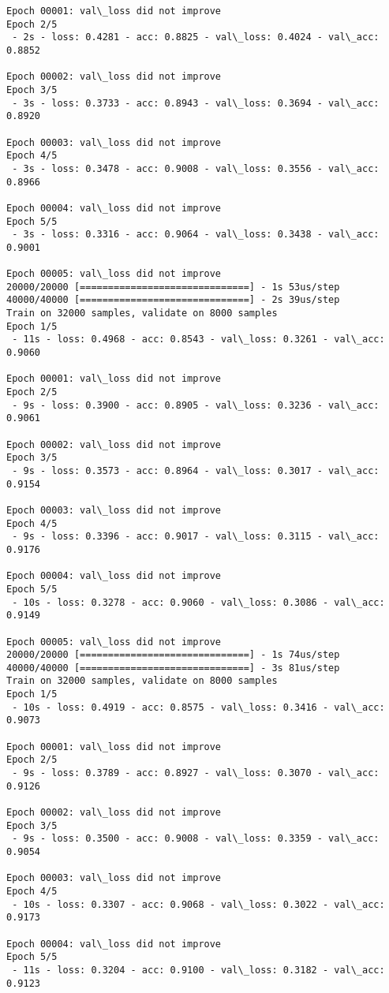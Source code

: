 \documentclass[11pt]{article}
\begin{document}
\begin{Verbatim}[commandchars=\\\{\}]
Epoch 00001: val\_loss did not improve
Epoch 2/5
 - 2s - loss: 0.4281 - acc: 0.8825 - val\_loss: 0.4024 - val\_acc: 0.8852

Epoch 00002: val\_loss did not improve
Epoch 3/5
 - 3s - loss: 0.3733 - acc: 0.8943 - val\_loss: 0.3694 - val\_acc: 0.8920

Epoch 00003: val\_loss did not improve
Epoch 4/5
 - 3s - loss: 0.3478 - acc: 0.9008 - val\_loss: 0.3556 - val\_acc: 0.8966

Epoch 00004: val\_loss did not improve
Epoch 5/5
 - 3s - loss: 0.3316 - acc: 0.9064 - val\_loss: 0.3438 - val\_acc: 0.9001

Epoch 00005: val\_loss did not improve
20000/20000 [==============================] - 1s 53us/step
40000/40000 [==============================] - 2s 39us/step
Train on 32000 samples, validate on 8000 samples
Epoch 1/5
 - 11s - loss: 0.4968 - acc: 0.8543 - val\_loss: 0.3261 - val\_acc: 0.9060

Epoch 00001: val\_loss did not improve
Epoch 2/5
 - 9s - loss: 0.3900 - acc: 0.8905 - val\_loss: 0.3236 - val\_acc: 0.9061

Epoch 00002: val\_loss did not improve
Epoch 3/5
 - 9s - loss: 0.3573 - acc: 0.8964 - val\_loss: 0.3017 - val\_acc: 0.9154

Epoch 00003: val\_loss did not improve
Epoch 4/5
 - 9s - loss: 0.3396 - acc: 0.9017 - val\_loss: 0.3115 - val\_acc: 0.9176

Epoch 00004: val\_loss did not improve
Epoch 5/5
 - 10s - loss: 0.3278 - acc: 0.9060 - val\_loss: 0.3086 - val\_acc: 0.9149

Epoch 00005: val\_loss did not improve
20000/20000 [==============================] - 1s 74us/step
40000/40000 [==============================] - 3s 81us/step
Train on 32000 samples, validate on 8000 samples
Epoch 1/5
 - 10s - loss: 0.4919 - acc: 0.8575 - val\_loss: 0.3416 - val\_acc: 0.9073

Epoch 00001: val\_loss did not improve
Epoch 2/5
 - 9s - loss: 0.3789 - acc: 0.8927 - val\_loss: 0.3070 - val\_acc: 0.9126

Epoch 00002: val\_loss did not improve
Epoch 3/5
 - 9s - loss: 0.3500 - acc: 0.9008 - val\_loss: 0.3359 - val\_acc: 0.9054

Epoch 00003: val\_loss did not improve
Epoch 4/5
 - 10s - loss: 0.3307 - acc: 0.9068 - val\_loss: 0.3022 - val\_acc: 0.9173

Epoch 00004: val\_loss did not improve
Epoch 5/5
 - 11s - loss: 0.3204 - acc: 0.9100 - val\_loss: 0.3182 - val\_acc: 0.9123


\end{Verbatim}
\end{document}
